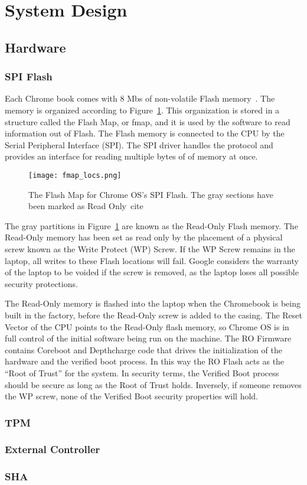 \documentclass[../report.tex]{subfiles}
\begin{document}
\onehalfspacing

\section{System Design}

\subsection{Hardware}

\subsubsection{SPI Flash}

Each Chrome book comes with 8 Mbs of non-volatile Flash memory~\cite{fw-summit}.
The memory is organized according to Figure~\ref{fig:fmap}. 
This organization is stored in a structure called the Flash Map, or fmap, and it is used by the software to read information out of Flash.
The Flash memory is connected to the CPU by the Serial Peripheral Interface (SPI).
The SPI driver handles the protocol and provides an interface for reading multiple bytes of of memory at once.


\begin{figure}
  \centering
  \texttt{[image: fmap\_locs.png]}
  \caption{The Flash Map for Chrome OS's SPI Flash. The gray sections have been marked as Read Only~cite\cite{fw-summit}}
  \label{fig:fmap}
\end{figure}

The gray partitions in Figure~\ref{fig:fmap} are known as the Read-Only Flash memory.
The Read-Only memory has been set as read only by the placement of a physical screw known as the Write Protect (WP) Screw.
If the WP Screw remains in the laptop, all writes to these Flash locations will fail.
Google considers the warranty of the laptop to be voided if the screw is removed, as the laptop loses all possible security protections. 

The Read-Only memory is flashed into the laptop when the Chromebook is being built in the factory, before the Read-Only screw is added to the casing. 
The Reset Vector of the CPU points to the Read-Only flash memory, so Chrome OS is in full control of the initial software being run on the machine.
The RO Firmware contains Coreboot and Depthcharge code that drives the initialization of the hardware and the verified boot process. 
In this way the RO Flash acts as the ``Root of Trust'' for the system.
In security terms, the Verified Boot process should be secure as long as the Root of Trust holds.
Inversely, if someone removes the WP screw, none of the Verified Boot security properties will hold.


\subsubsection{TPM}

\subsubsection{External Controller}

\subsubsection{SHA}
\end{document}
